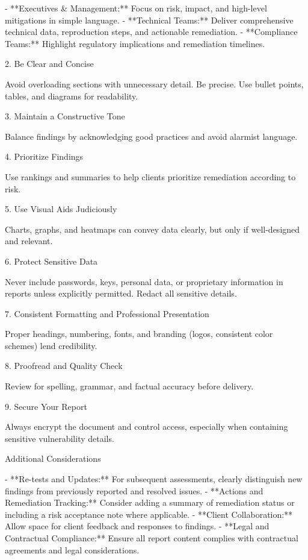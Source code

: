- **Executives \& Management:** Focus on risk, impact, and high-level mitigations in simple language.
- **Technical Teams:** Deliver comprehensive technical data, reproduction steps, and actionable remediation.
- **Compliance Teams:** Highlight regulatory implications and remediation timelines.

2. Be Clear and Concise

Avoid overloading sections with unnecessary detail. Be precise. Use bullet points, tables, and diagrams for readability.

3. Maintain a Constructive Tone

Balance findings by acknowledging good practices and avoid alarmist language.

4. Prioritize Findings

Use rankings and summaries to help clients prioritize remediation according to risk.

5. Use Visual Aids Judiciously

Charts, graphs, and heatmaps can convey data clearly, but only if well-designed and relevant.

6. Protect Sensitive Data

Never include passwords, keys, personal data, or proprietary information in reports unless explicitly permitted. Redact all sensitive details.

7. Consistent Formatting and Professional Presentation

Proper headings, numbering, fonts, and branding (logos, consistent color schemes) lend credibility.

8. Proofread and Quality Check

Review for spelling, grammar, and factual accuracy before delivery.

9. Secure Your Report

Always encrypt the document and control access, especially when containing sensitive vulnerability details.


Additional Considerations

- **Re-tests and Updates:** For subsequent assessments, clearly distinguish new findings from previously reported and resolved issues.
- **Actions and Remediation Tracking:** Consider adding a summary of remediation status or including a risk acceptance note where applicable.
- **Client Collaboration:** Allow space for client feedback and responses to findings.
- **Legal and Contractual Compliance:** Ensure all report content complies with contractual agreements and legal considerations.


